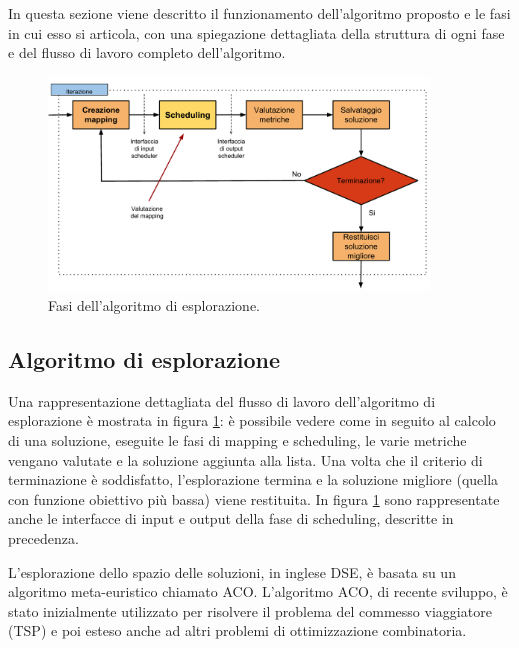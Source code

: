 In questa sezione viene descritto il funzionamento dell'algoritmo proposto e le 
fasi in cui esso si articola, con una spiegazione dettagliata della struttura 
di ogni fase e del flusso di lavoro completo dell'algoritmo.


\begin{figure}
 \begin{center}
  \includegraphics[width=0.9\textwidth]{capitoli/figure/cap4/MapperWorkflow.pdf}
  \caption{Fasi dell'algoritmo di esplorazione.}
  \label{fig:flussoDettagliatoACO}
 \end{center}
\end{figure}


\subsection{Algoritmo di esplorazione}
Una rappresentazione dettagliata del flusso di lavoro dell'algoritmo di
esplorazione \`e mostrata in figura \ref{fig:flussoDettagliatoACO}: \`e
possibile vedere come in seguito al calcolo di una soluzione, eseguite le fasi
di mapping e scheduling, le varie metriche vengano valutate e la soluzione
aggiunta alla lista. Una volta che il criterio di terminazione \`e soddisfatto,
l'esplorazione termina e la soluzione migliore (quella con funzione obiettivo pi\`u
bassa) viene restituita. In figura \ref{fig:flussoDettagliatoACO} sono rappresentate
anche le interfacce di input e output della fase di scheduling, descritte in precedenza.

L'esplorazione dello spazio delle soluzioni, in inglese \ac{DSE},  \`e basata su un algoritmo
meta-euristico chiamato \acf{ACO}. L'algoritmo \ac{ACO}, di recente sviluppo, è stato inizialmente 
utilizzato per risolvere il problema del commesso viaggiatore (\acs{TSP}) 
\cite{AntSystem} e poi esteso anche ad altri problemi di ottimizzazione 
combinatoria.

